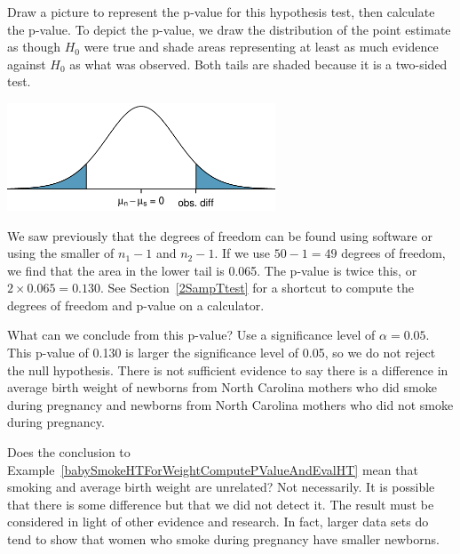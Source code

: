 \begin{examplewrap}
\begin{nexample}{Draw a picture to represent the p-value for this hypothesis test, then calculate the p-value.}
\label{pictureOfPValueForEstimateOfDiffOfMeansOfBirthWeights}
To depict the p-value, we draw the distribution of the point estimate as though $H_0$ were true and shade areas representing at least as much evidence against $H_0$ as what was observed. Both tails are shaded because it is a two-sided test.
\begin{center}
\includegraphics[width=0.6\textwidth]{ch_inference_for_means/figures/distOfDiffOfSampleMeansForBWOfBabySmokeData/distOfDiffOfSampleMeansForBWOfBabySmokeData}
\end{center}
We saw previously that the degrees of freedom can be found using software or using the smaller of $n_1-1$ and $n_2-1$.  If we use $50-1=49$ degrees of freedom, we find that the area in the lower tail is 0.065.  The p-value is twice this, or $2\times 0.065= 0.130$.  See Section~\ref{2SampTtest} for a shortcut to compute the degrees of freedom and p-value on a calculator.
\end{nexample}
\end{examplewrap}

\begin{examplewrap}
\begin{nexample}{What can we conclude from this p-value?  Use a significance level of $\alpha=0.05$.  }
\label{pictureOfPValueForEstimateOfDiffOfMeansOfBirthWeights}
This p-value of 0.130 is larger the significance level of 0.05, so we do not reject the null hypothesis. There is not sufficient evidence to say there is a difference in average birth weight of newborns from North Carolina mothers who did smoke during pregnancy and newborns from North Carolina mothers who did not smoke during pregnancy.
\end{nexample}
\end{examplewrap}




\begin{examplewrap}
\begin{nexample}
{Does the conclusion to Example~\ref{babySmokeHTForWeightComputePValueAndEvalHT} mean that smoking and average birth weight are unrelated?}
Not necessarily. It is possible that there is some difference but that we did not detect it.  The result must be considered in light of other evidence and research.  In fact, larger data sets do tend to show that women who smoke during pregnancy have smaller newborns.
\end{nexample}
\end{examplewrap}


